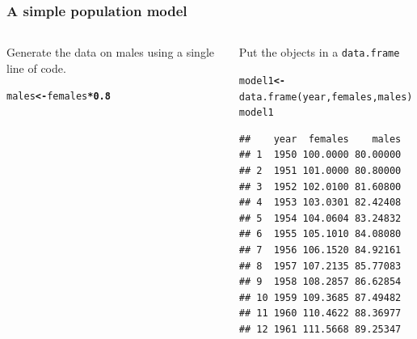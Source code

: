 \documentclass[color=usenames,dvipsnames]{beamer}\usepackage[]{graphicx}\usepackage[]{color}
\makeatletter
\newcommand{\hlnum}[1]{\textcolor[rgb]{0.502,0,0.502}{\textbf{#1}}}%
\newcommand{\hlopt}[1]{\textcolor[rgb]{1,0,0.502}{\textbf{#1}}}%
\newcommand{\hlstd}[1]{\textcolor[rgb]{0,0,0}{#1}}%
\newcommand{\hlkwb}[1]{\textcolor[rgb]{0.502,0.502,0.753}{\textbf{#1}}}%
\newcommand{\hlkwd}[1]{\textcolor[rgb]{0,0.267,0.4}{#1}}%
\newenvironment{kframe}{%
 \def\at@end@of@kframe{}%
 \ifinner\ifhmode%
  \def\at@end@of@kframe{\end{minipage}}%
  \begin{minipage}{\columnwidth}%
 \fi\fi%
 \def\FrameCommand##1{\hskip\@totalleftmargin \hskip-\fboxsep
 \colorbox{shadecolor}{##1}\hskip-\fboxsep
     \hskip-\linewidth \hskip-\@totalleftmargin \hskip\columnwidth}%
 \MakeFramed {\advance\hsize-\width
   \@totalleftmargin\z@ \linewidth\hsize
   \@setminipage}}%
 {\par\unskip\endMakeFramed%
 \at@end@of@kframe}
\newenvironment{knitrout}{}{} %
\newcommand{\inr}[1]{\colorbox{inlinecolor}{\texttt{#1}}}
\makeatother
\begin{document}
\begin{frame}[fragile]
  \frametitle{A simple population model}
  \begin{columns}
    \begin{column}{0.4\textwidth}
      Generate the data on males using a single line of code.
\begin{knitrout}\footnotesize
{}\color{fgcolor}\begin{kframe}
\begin{alltt}
\hlstd{males} \hlkwb{<-} \hlstd{females}\hlopt{*}\hlnum{0.8}
\end{alltt}
\end{kframe}
\end{knitrout}
    \end{column}
\pause
    \begin{column}{0.59\textwidth}
      Put the objects in a \inr{data.frame}
\begin{knitrout}\footnotesize
{}\color{fgcolor}\begin{kframe}
\begin{alltt}
\hlstd{model1} \hlkwb{<-} \hlkwd{data.frame}\hlstd{(year, females, males)}
\hlstd{model1}
\end{alltt}
\begin{verbatim}
##    year  females    males
## 1  1950 100.0000 80.00000
## 2  1951 101.0000 80.80000
## 3  1952 102.0100 81.60800
## 4  1953 103.0301 82.42408
## 5  1954 104.0604 83.24832
## 6  1955 105.1010 84.08080
## 7  1956 106.1520 84.92161
## 8  1957 107.2135 85.77083
## 9  1958 108.2857 86.62854
## 10 1959 109.3685 87.49482
## 11 1960 110.4622 88.36977
## 12 1961 111.5668 89.25347
\end{verbatim}
\end{kframe}
\end{knitrout}
    \end{column}
  \end{columns}
\end{frame}
\end{document}
